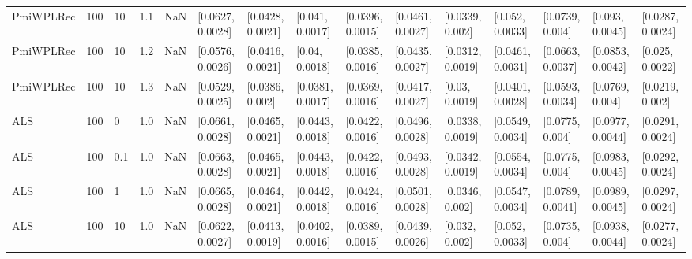 \begin{tabular}{lllrrllllllllll}
 PmiWPLRec &  100 &    10 &   1.1 &   NaN &  [0.0627, 0.0028] &  [0.0428, 0.0021] &   [0.041, 0.0017] &  [0.0396, 0.0015] &  [0.0461, 0.0027] &   [0.0339, 0.002] &   [0.052, 0.0033] &   [0.0739, 0.004] &   [0.093, 0.0045] &  [0.0287, 0.0024] \\
 PmiWPLRec &  100 &    10 &   1.2 &   NaN &  [0.0576, 0.0026] &  [0.0416, 0.0021] &    [0.04, 0.0018] &  [0.0385, 0.0016] &  [0.0435, 0.0027] &  [0.0312, 0.0019] &  [0.0461, 0.0031] &  [0.0663, 0.0037] &  [0.0853, 0.0042] &   [0.025, 0.0022] \\
 PmiWPLRec &  100 &    10 &   1.3 &   NaN &  [0.0529, 0.0025] &   [0.0386, 0.002] &  [0.0381, 0.0017] &  [0.0369, 0.0016] &  [0.0417, 0.0027] &    [0.03, 0.0019] &  [0.0401, 0.0028] &  [0.0593, 0.0034] &   [0.0769, 0.004] &   [0.0219, 0.002] \\
       ALS &  100 &     0 &   1.0 &   NaN &  [0.0661, 0.0028] &  [0.0465, 0.0021] &  [0.0443, 0.0018] &  [0.0422, 0.0016] &  [0.0496, 0.0028] &  [0.0338, 0.0019] &  [0.0549, 0.0034] &   [0.0775, 0.004] &  [0.0977, 0.0044] &  [0.0291, 0.0024] \\
       ALS &  100 &   0.1 &   1.0 &   NaN &  [0.0663, 0.0028] &  [0.0465, 0.0021] &  [0.0443, 0.0018] &  [0.0422, 0.0016] &  [0.0493, 0.0028] &  [0.0342, 0.0019] &  [0.0554, 0.0034] &   [0.0775, 0.004] &  [0.0983, 0.0045] &  [0.0292, 0.0024] \\
       ALS &  100 &     1 &   1.0 &   NaN &  [0.0665, 0.0028] &  [0.0464, 0.0021] &  [0.0442, 0.0018] &  [0.0424, 0.0016] &  [0.0501, 0.0028] &   [0.0346, 0.002] &  [0.0547, 0.0034] &  [0.0789, 0.0041] &  [0.0989, 0.0045] &  [0.0297, 0.0024] \\
       ALS &  100 &    10 &   1.0 &   NaN &  [0.0622, 0.0027] &  [0.0413, 0.0019] &  [0.0402, 0.0016] &  [0.0389, 0.0015] &  [0.0439, 0.0026] &    [0.032, 0.002] &   [0.052, 0.0033] &   [0.0735, 0.004] &  [0.0938, 0.0044] &  [0.0277, 0.0024] \\
\bottomrule
\end{tabular}
